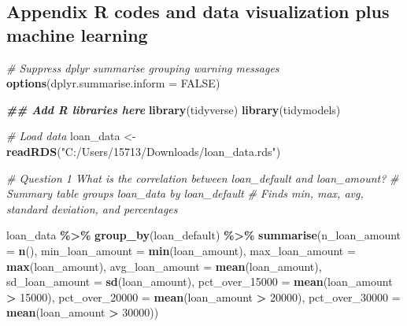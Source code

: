 \documentclass[
]{article}
\newenvironment{Shaded}{\begin{snugshade}}{\end{snugshade}}
\newcommand{\AttributeTok}[1]{\textcolor[rgb]{0.13,0.29,0.53}{#1}}
\newcommand{\CommentTok}[1]{\textcolor[rgb]{0.56,0.35,0.01}{\textit{#1}}}
\newcommand{\ConstantTok}[1]{\textcolor[rgb]{0.56,0.35,0.01}{#1}}
\newcommand{\DecValTok}[1]{\textcolor[rgb]{0.00,0.00,0.81}{#1}}
\newcommand{\DocumentationTok}[1]{\textcolor[rgb]{0.56,0.35,0.01}{\textbf{\textit{#1}}}}
\newcommand{\FunctionTok}[1]{\textcolor[rgb]{0.13,0.29,0.53}{\textbf{#1}}}
\newcommand{\NormalTok}[1]{#1}
\newcommand{\OtherTok}[1]{\textcolor[rgb]{0.56,0.35,0.01}{#1}}
\newcommand{\SpecialCharTok}[1]{\textcolor[rgb]{0.81,0.36,0.00}{\textbf{#1}}}
\newcommand{\StringTok}[1]{\textcolor[rgb]{0.31,0.60,0.02}{#1}}
\begin{document}
\subsection{Appendix R codes and data visualization plus machine
learning}\label{appendix-r-codes-and-data-visualization-plus-machine-learning}

\begin{Shaded}
\begin{Highlighting}[]
\CommentTok{\# Suppress dplyr summarise grouping warning messages}
\FunctionTok{options}\NormalTok{(}\AttributeTok{dplyr.summarise.inform =} \ConstantTok{FALSE}\NormalTok{)}

\DocumentationTok{\#\# Add R libraries here}
\FunctionTok{library}\NormalTok{(tidyverse)}
\FunctionTok{library}\NormalTok{(tidymodels)}

\CommentTok{\# Load data}
\NormalTok{loan\_data }\OtherTok{\textless{}{-}} \FunctionTok{readRDS}\NormalTok{(}\StringTok{"C:/Users/15713/Downloads/loan\_data.rds"}\NormalTok{)}

\CommentTok{\# Question 1 What is the correlation between loan\_default and loan\_amount?}
\CommentTok{\# Summary table groups loan\_data by loan\_default}
\CommentTok{\# Finds min, max, avg, standard deviation, and percentages}

\NormalTok{loan\_data }\SpecialCharTok{\%\textgreater{}\%} \FunctionTok{group\_by}\NormalTok{(loan\_default) }\SpecialCharTok{\%\textgreater{}\%} 
                  \FunctionTok{summarise}\NormalTok{(}\AttributeTok{n\_loan\_amount =} \FunctionTok{n}\NormalTok{(),}
                            \AttributeTok{min\_loan\_amount =} \FunctionTok{min}\NormalTok{(loan\_amount),}
                            \AttributeTok{max\_loan\_amount =} \FunctionTok{max}\NormalTok{(loan\_amount),}
                            \AttributeTok{avg\_loan\_amount =} \FunctionTok{mean}\NormalTok{(loan\_amount), }
                            \AttributeTok{sd\_loan\_amount =} \FunctionTok{sd}\NormalTok{(loan\_amount),}
                            \AttributeTok{pct\_over\_15000 =} \FunctionTok{mean}\NormalTok{(loan\_amount }\SpecialCharTok{\textgreater{}} \DecValTok{15000}\NormalTok{),}
                            \AttributeTok{pct\_over\_20000 =} \FunctionTok{mean}\NormalTok{(loan\_amount }\SpecialCharTok{\textgreater{}} \DecValTok{20000}\NormalTok{),}
                            \AttributeTok{pct\_over\_30000 =} \FunctionTok{mean}\NormalTok{(loan\_amount }\SpecialCharTok{\textgreater{}} \DecValTok{30000}\NormalTok{))}
\end{Highlighting}
\end{Shaded}
\end{document}
